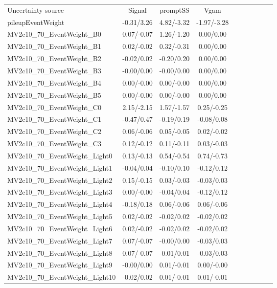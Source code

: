 \begin{table}[h]
\scriptsize
\begin{center}
\begin{tabular}{l|ccccccccc}
\hline
\hline
Uncertainty source &Signal &promptSS &Vgam \\
pileupEventWeight &-0.31/3.26 &4.82/-3.32 &-1.97/-3.28 \\
MV2c10\_70\_EventWeight\_B0 &0.07/-0.07 &1.26/-1.20 &0.00/0.00 \\
MV2c10\_70\_EventWeight\_B1 &0.02/-0.02 &0.32/-0.31 &0.00/0.00 \\
MV2c10\_70\_EventWeight\_B2 &-0.02/0.02 &-0.20/0.20 &0.00/0.00 \\
MV2c10\_70\_EventWeight\_B3 &-0.00/0.00 &-0.00/0.00 &0.00/0.00 \\
MV2c10\_70\_EventWeight\_B4 &0.00/-0.00 &0.00/-0.00 &0.00/0.00 \\
MV2c10\_70\_EventWeight\_B5 &0.00/-0.00 &0.00/-0.00 &0.00/0.00 \\
MV2c10\_70\_EventWeight\_C0 &2.15/-2.15 &1.57/-1.57 &0.25/-0.25 \\
MV2c10\_70\_EventWeight\_C1 &-0.47/0.47 &-0.19/0.19 &-0.08/0.08 \\
MV2c10\_70\_EventWeight\_C2 &0.06/-0.06 &0.05/-0.05 &0.02/-0.02 \\
MV2c10\_70\_EventWeight\_C3 &0.12/-0.12 &0.11/-0.11 &0.03/-0.03 \\
MV2c10\_70\_EventWeight\_Light0 &0.13/-0.13 &0.54/-0.54 &0.74/-0.73 \\
MV2c10\_70\_EventWeight\_Light1 &-0.04/0.04 &-0.10/0.10 &-0.12/0.12 \\
MV2c10\_70\_EventWeight\_Light2 &0.15/-0.15 &0.03/-0.03 &-0.03/0.03 \\
MV2c10\_70\_EventWeight\_Light3 &0.00/-0.00 &-0.04/0.04 &-0.12/0.12 \\
MV2c10\_70\_EventWeight\_Light4 &-0.18/0.18 &0.06/-0.06 &0.06/-0.06 \\
MV2c10\_70\_EventWeight\_Light5 &0.02/-0.02 &-0.02/0.02 &-0.02/0.02 \\
MV2c10\_70\_EventWeight\_Light6 &0.02/-0.02 &-0.02/0.02 &-0.02/0.02 \\
MV2c10\_70\_EventWeight\_Light7 &0.07/-0.07 &-0.00/0.00 &-0.03/0.03 \\
MV2c10\_70\_EventWeight\_Light8 &0.07/-0.07 &-0.01/0.01 &-0.03/0.03 \\
MV2c10\_70\_EventWeight\_Light9 &-0.00/0.00 &0.01/-0.01 &0.00/-0.00 \\
MV2c10\_70\_EventWeight\_Light10 &-0.02/0.02 &0.01/-0.01 &0.01/-0.01 \\

\end{tabular}
\end{center}
\end{table}
